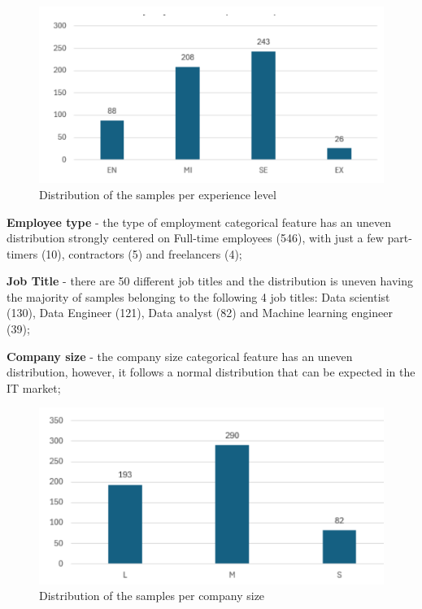 \documentclass[11pt,a4paper]{article}
\newcommand{\SubItem}[1]{
  {\setlength\itemindent{13pt} \item[◦] #1}
}
\begin{document}
\begin{itemize}
\begin{figure}
    \centering
    \includegraphics[width=1\linewidth]{ICS-5110-Fig-05.png}
    \caption{Distribution of the samples per experience level}
    \label{fig:Distribution of the samples per experience level}
\end{figure}

\SubItem{\textbf{Employee type} - the type of employment categorical feature has an uneven distribution strongly centered on Full-time employees (546), with just a few part-timers (10), contractors (5) and freelancers (4);}
\SubItem{\textbf{Job Title} - there are 50 different job titles and the distribution is uneven having the majority of samples belonging to the following 4 job titles: Data scientist (130), Data Engineer (121), Data analyst (82) and Machine learning engineer (39);}
\SubItem{\textbf{Company size} - the company size  categorical feature has an uneven distribution, however, it follows a normal distribution that can be expected in the IT market;}

\begin{figure}
    \centering
    \includegraphics[width=1\linewidth]{ICS-5110-Fig-06.png}
    \caption{Distribution of the samples per company size}
    \label{fig:Distribution of the samples per company size}
\end{figure}


\end{itemize}
\end{document}
